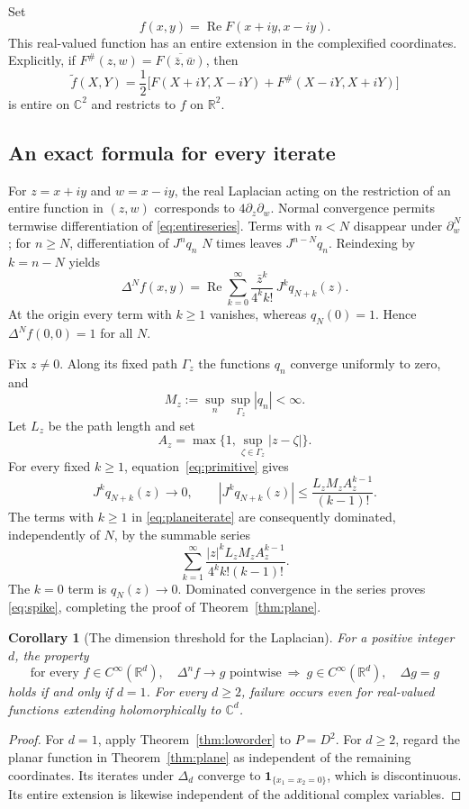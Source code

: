 \documentclass[11pt,reqno]{amsart}
\numberwithin{equation}{section}
\newtheorem{corollary}[theorem]{Corollary}
\theoremstyle{definition}
\theoremstyle{remark}
\newcommand{\R}{\mathbb R}
\newcommand{\C}{\mathbb C}
\begin{document}
Set
\begin{equation}\label{eq:realplane}
 f(x,y)=\operatorname{Re}F(x+iy,x-iy).
\end{equation}
This real-valued function has an entire extension in the complexified coordinates. Explicitly, if $F^\#(z,w)=\overline{F(\bar z,\bar w)}$, then
\[
 \widetilde f(X,Y)=\frac12\bigl[F(X+iY,X-iY)+F^\#(X-iY,X+iY)\bigr]
\]
is entire on $\C^2$ and restricts to $f$ on $\R^2$.

\subsection{An exact formula for every iterate}
For $z=x+iy$ and $w=x-iy$, the real Laplacian acting on the restriction of an entire function in $(z,w)$ corresponds to $4\partial_z\partial_w$. Normal convergence permits termwise differentiation of \eqref{eq:entireseries}. Terms with $n<N$ disappear under $\partial_w^N$; for $n\ge N$, differentiation of $J^nq_n$ $N$ times leaves $J^{n-N}q_n$. Reindexing by $k=n-N$ yields
\begin{equation}\label{eq:planeiterate}
 \Delta^Nf(x,y)=\operatorname{Re}\sum_{k=0}^{\infty}
 \frac{\bar z^k}{4^k k!}\,J^kq_{N+k}(z).
\end{equation}
At the origin every term with $k\ge1$ vanishes, whereas $q_N(0)=1$. Hence $\Delta^Nf(0,0)=1$ for all $N$.

Fix $z\ne0$. Along its fixed path $\Gamma_z$ the functions $q_n$ converge uniformly to zero, and
\[
 M_z:=\sup_n\sup_{\Gamma_z}|q_n|<\infty.
\]
Let $L_z$ be the path length and set
\[
 A_z=\max\{1,\sup_{\zeta\in\Gamma_z}|z-\zeta|\}.
\]
For every fixed $k\ge1$, equation~\eqref{eq:primitive} gives
\[
 J^kq_{N+k}(z)\longrightarrow0,
 \qquad
 |J^kq_{N+k}(z)|\le\frac{L_zM_z A_z^{k-1}}{(k-1)!}.
\]
The terms with $k\ge1$ in \eqref{eq:planeiterate} are consequently dominated, independently of $N$, by the summable series
\[
 \sum_{k=1}^{\infty}
 \frac{|z|^k L_zM_z A_z^{k-1}}{4^k k!(k-1)!}.
\]
The $k=0$ term is $q_N(z)\to0$. Dominated convergence in the series proves \eqref{eq:spike}, completing the proof of Theorem~\ref{thm:plane}.

\begin{corollary}[The dimension threshold for the Laplacian]\label{cor:dimension}
For a positive integer $d$, the property
\[
 \text{for every }f\in C^\infty(\R^d),\quad
 \Delta^nf\to g\text{ pointwise}
 \ \Longrightarrow\ g\in C^\infty(\R^d),\quad\Delta g=g
\]
holds if and only if $d=1$. For every $d\ge2$, failure occurs even for real-valued functions extending holomorphically to $\C^d$.
\end{corollary}
\begin{proof}
For $d=1$, apply Theorem~\ref{thm:loworder} to $P=D^2$. For $d\ge2$, regard the planar function in Theorem~\ref{thm:plane} as independent of the remaining coordinates. Its iterates under $\Delta_d$ converge to $\mathbf1_{\{x_1=x_2=0\}}$, which is discontinuous. Its entire extension is likewise independent of the additional complex variables.
\end{proof}
\end{document}
